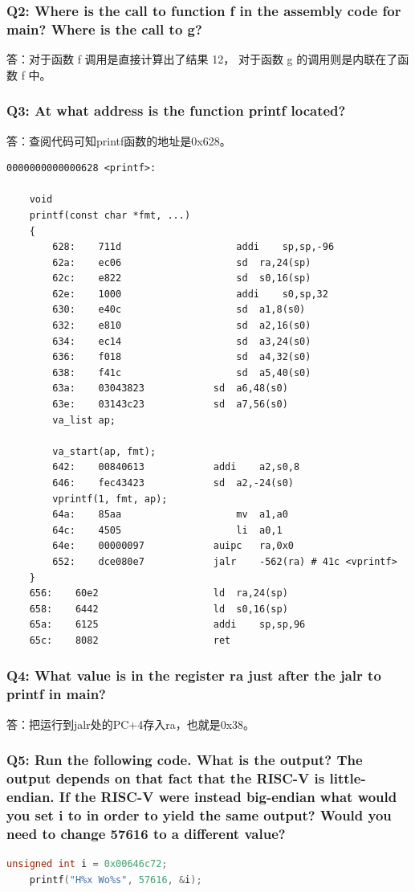 \subsubsection*{Q2: Where is the call to function f in the assembly code for main? Where is the call to g?}

答：对于函数 f 调用是直接计算出了结果 12， 对于函数 g 的调用则是内联在了函数 f 中。

\subsubsection*{Q3: At what address is the function printf located?}

答：查阅代码可知printf函数的地址是0x628。
\begin{lstlisting}[language={[x86masm]Assembler}, title=printf函数]
    0000000000000628 <printf>:

    void
    printf(const char *fmt, ...)
    {
        628:	711d                	addi	sp,sp,-96
        62a:	ec06                	sd	ra,24(sp)
        62c:	e822                	sd	s0,16(sp)
        62e:	1000                	addi	s0,sp,32
        630:	e40c                	sd	a1,8(s0)
        632:	e810                	sd	a2,16(s0)
        634:	ec14                	sd	a3,24(s0)
        636:	f018                	sd	a4,32(s0)
        638:	f41c                	sd	a5,40(s0)
        63a:	03043823          	sd	a6,48(s0)
        63e:	03143c23          	sd	a7,56(s0)
        va_list ap;

        va_start(ap, fmt);
        642:	00840613          	addi	a2,s0,8
        646:	fec43423          	sd	a2,-24(s0)
        vprintf(1, fmt, ap);
        64a:	85aa                	mv	a1,a0
        64c:	4505                	li	a0,1
        64e:	00000097          	auipc	ra,0x0
        652:	dce080e7          	jalr	-562(ra) # 41c <vprintf>
    }
    656:	60e2                	ld	ra,24(sp)
    658:	6442                	ld	s0,16(sp)
    65a:	6125                	addi	sp,sp,96
    65c:	8082                	ret
\end{lstlisting}

\subsubsection*{Q4: What value is in the register ra just after the jalr to printf in main?}

答：把运行到jalr处的PC+4存入ra，也就是0x38。

\subsubsection*{Q5: Run the following code. What is the output? The output depends on that fact that the RISC-V is little-endian. If the RISC-V were instead big-endian what would you set i to in order to yield the same output? Would you need to change 57616 to a different value?}
\begin{lstlisting}[language=c, title=Code for Question]
    unsigned int i = 0x00646c72;
    printf("H%x Wo%s", 57616, &i);
\end{lstlisting}

